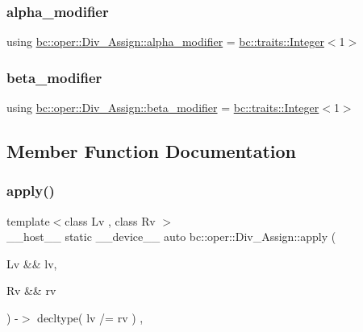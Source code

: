 \subsubsection{\texorpdfstring{alpha\+\_\+modifier}{alpha\_modifier}}
{\footnotesize\ttfamily using \hyperlink{structbc_1_1oper_1_1Div__Assign_a3ee36b5ca9c50bbaa7cedf38da7dae7e}{bc\+::oper\+::\+Div\+\_\+\+Assign\+::alpha\+\_\+modifier} =  \hyperlink{structbc_1_1traits_1_1Integer}{bc\+::traits\+::\+Integer}$<$1$>$}

\mbox{\label{structbc_1_1oper_1_1Div__Assign_a90bbb13282a3f046385a9b92a02ee446}} 
\subsubsection{\texorpdfstring{beta\+\_\+modifier}{beta\_modifier}}
{\footnotesize\ttfamily using \hyperlink{structbc_1_1oper_1_1Div__Assign_a90bbb13282a3f046385a9b92a02ee446}{bc\+::oper\+::\+Div\+\_\+\+Assign\+::beta\+\_\+modifier} =  \hyperlink{structbc_1_1traits_1_1Integer}{bc\+::traits\+::\+Integer}$<$1$>$}



\subsection{Member Function Documentation}
\mbox{\label{structbc_1_1oper_1_1Div__Assign_a0baa46adbdde01c10dd58ce3d02bc62f}} 
\subsubsection{\texorpdfstring{apply()}{apply()}}
{\footnotesize\ttfamily template$<$class Lv , class Rv $>$ \\
\+\_\+\+\_\+host\+\_\+\+\_\+ static \+\_\+\+\_\+device\+\_\+\+\_\+ auto bc\+::oper\+::\+Div\+\_\+\+Assign\+::apply (\begin{DoxyParamCaption}\item[{Lv \&\&}]{lv,  }\item[{Rv \&\&}]{rv }\end{DoxyParamCaption}) -\/$>$ decltype( lv /= rv ) \hspace{0.3cm}{\ttfamily [inline]}, {\ttfamily [static]}}

